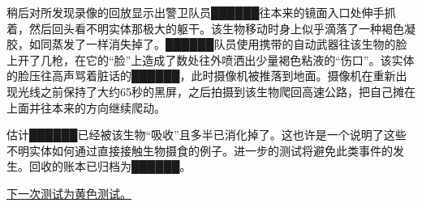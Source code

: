 \begin{scpbox}
稍后对所发现录像的回放显示出警卫队员██████往本来的镜面入口处伸手抓着，然后回头看不明实体那极大的躯干。该生物移动时身上似乎滴落了一种褐色凝胶，如同蒸发了一样消失掉了。██████队员使用携带的自动武器往该生物的脸上开了几枪，在它的“脸”上造成了数处往外喷洒出少量褐色粘液的“伤口”。该实体的脸压往高声骂着脏话的██████，此时摄像机被推落到地面。摄像机在重新出现光线之前保持了大约65秒的黑屏，之后拍摄到该生物爬回高速公路，把自己摊在上面并往本来的方向继续爬动。

估计██████已经被该生物“吸收”且多半已消化掉了。这也许是一个说明了这些不明实体如何通过直接接触生物摄食的例子。进一步的测试将避免此类事件的发生。回收的账本已归档为██████。

\end{scpbox}

\hyperref[sec:DOC-scp-093-yellow-test]{下一次测试为黄色测试。}
